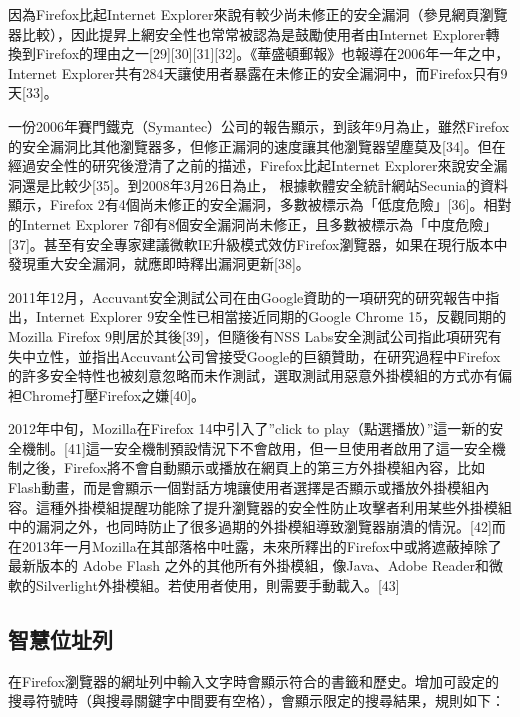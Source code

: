 \documentclass[12pt]{article}
\begin{document}
因為Firefox比起Internet Explorer來說有較少尚未修正的安全漏洞（參見網頁瀏覽器比較），因此提昇上網安全性也常常被認為是鼓勵使用者由Internet Explorer轉換到Firefox的理由之一[29][30][31][32]。《華盛頓郵報》也報導在2006年一年之中，Internet Explorer共有284天讓使用者暴露在未修正的安全漏洞中，而Firefox只有9天[33]。

一份2006年賽門鐵克（Symantec）公司的報告顯示，到該年9月為止，雖然Firefox的安全漏洞比其他瀏覽器多，但修正漏洞的速度讓其他瀏覽器望塵莫及[34]。但在經過安全性的研究後澄清了之前的描述，Firefox比起Internet Explorer來說安全漏洞還是比較少[35]。到2008年3月26日為止， 根據軟體安全統計網站Secunia的資料顯示，Firefox 2有4個尚未修正的安全漏洞，多數被標示為「低度危險」[36]。相對的Internet Explorer 7卻有8個安全漏洞尚未修正，且多數被標示為「中度危險」[37]。甚至有安全專家建議微軟IE升級模式效仿Firefox瀏覽器，如果在現行版本中發現重大安全漏洞，就應即時釋出漏洞更新[38]。

2011年12月，Accuvant安全測試公司在由Google資助的一項研究的研究報告中指出，Internet Explorer 9安全性已相當接近同期的Google Chrome 15，反觀同期的Mozilla Firefox 9則居於其後[39]，但隨後有NSS Labs安全測試公司指此項研究有失中立性，並指出Accuvant公司曾接受Google的巨額贊助，在研究過程中Firefox的許多安全特性也被刻意忽略而未作測試，選取測試用惡意外掛模組的方式亦有偏袒Chrome打壓Firefox之嫌[40]。

2012年中旬，Mozilla在Firefox 14中引入了''click to play（點選播放）''這一新的安全機制。[41]這一安全機制預設情況下不會啟用，但一旦使用者啟用了這一安全機制之後，Firefox將不會自動顯示或播放在網頁上的第三方外掛模組內容，比如Flash動畫，而是會顯示一個對話方塊讓使用者選擇是否顯示或播放外掛模組內容。這種外掛模組提醒功能除了提升瀏覽器的安全性防止攻擊者利用某些外掛模組中的漏洞之外，也同時防止了很多過期的外掛模組導致瀏覽器崩潰的情況。[42]而在2013年一月Mozilla在其部落格中吐露，未來所釋出的Firefox中或將遮蔽掉除了最新版本的 Adobe Flash 之外的其他所有外掛模組，像Java、Adobe Reader和微軟的Silverlight外掛模組。若使用者使用，則需要手動載入。[43]

\subsection{智慧位址列}

在Firefox瀏覽器的網址列中輸入文字時會顯示符合的書籤和歷史。增加可設定的搜尋符號時（與搜尋關鍵字中間要有空格），會顯示限定的搜尋結果，規則如下：
\end{document}
